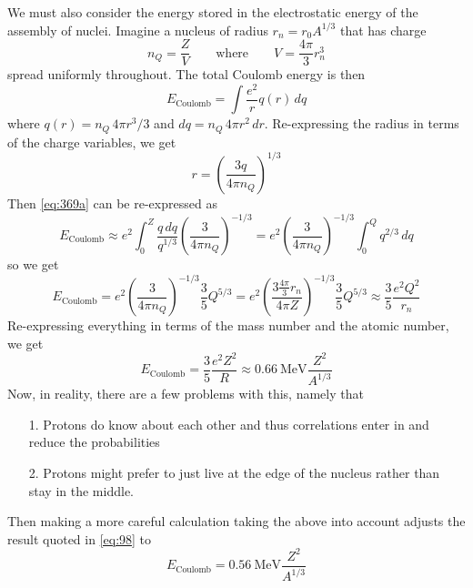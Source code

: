 \documentclass[10pt]{article}
\numberwithin{equation}{section}
\newcommand{\n}{\noindent}
\begin{document}
  \n We must also consider the energy stored in the electrostatic
  energy of the assembly of nuclei. Imagine a nucleus of radius
  $r_n=r_0A^{1/3}$ that has charge
  \begin{equation}
    \label{eq:368}
    n_Q=\frac{Z}{V}\qquad\textrm{where}\qquad V=\frac{4\pi}{3}r_n^3
  \end{equation}
  spread uniformly throughout. The total Coulomb energy is then
  \begin{equation}
    \label{eq:369a}
    E_{\mathrm{Coulomb}}=\int \frac{e^2}{r}q(r)\,dq
  \end{equation}
  where $q(r)=n_Q\, 4\pi r^3/3$ and $dq=n_Q\,4\pi
  r^2\,dr$. Re-expressing the radius in terms of the charge variables,
  we get
  \begin{equation}
    \label{eq:370}
    r=\left(\frac{3q}{4\pi n_Q}\right)^{1/3}
  \end{equation}
  Then \eqref{eq:369a} can be re-expressed as
  \begin{equation}
    \label{eq:371}
    E_{\mathrm{Coulomb}}\approx
      e^2\int_0^Z\frac{q\,dq}{q^{1/3}}\left(\frac{3}{4\pi
          n_Q}\right)^{-1/3}=e^2\left(\frac{3}{4\pi
          n_Q}\right)^{-1/3}\int_0^Q q^{2/3}\,dq
  \end{equation}
  so we get
  \begin{equation}
    \label{eq:372}
    E_{\mathrm{Coulomb}}=e^2\left(\frac{3}{4\pi n_Q}\right)^{-1/3}
    \frac{3}{5}Q^{5/3} = e^2 \left(\frac{3\frac{4\pi}{3}r_n}{4\pi
    Z}\right)^{-1/3} \frac{3}{5} Q^{5/3} \approx \frac{3}{5} \frac{e^2Q^2}{r_n}
  \end{equation}
  Re-expressing everything in terms of the mass number and the atomic
  number, we get
  \begin{equation}
    \label{eq:98}
    E_{\mathrm{Coulomb}}=\frac{3}{5}\frac{e^2
      Z^2}{R}\approx 0.66\ \mathrm{MeV}\frac{Z^2}{A^{1/3}}
  \end{equation}
  Now, in reality, there are a few problems with this, namely that
  \begin{enumerate}
  \item[1.] Protons do know about each other and thus correlations
    enter in and reduce the probabilities
  \item[2.] Protons might prefer to just live at the edge of the
    nucleus rather than stay in the middle.
  \end{enumerate}
  Then making a more careful calculation taking the above into account
  adjusts the result quoted in \eqref{eq:98} to
  \begin{equation}
    \label{eq:373}
    E_{\mathrm{Coulomb}}=0.56\ \mathrm{MeV}\frac{Z^2}{A^{1/3}}
  \end{equation}
\end{document}
